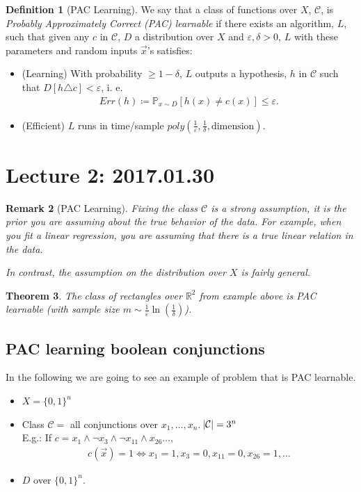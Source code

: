 \documentclass[12pt, letterpaper]{article}
\numberwithin{equation}{section} %
\newcommand{\R}{\mathbb{R}}
\newcommand{\mb}{\mathbb}
\newcommand{\mc}{\mathcal}
\newcommand{\ve}{\varepsilon}
\newtheorem{theorem}{Theorem}[section]
\newtheorem{remark}[theorem]{Remark}
\theoremstyle{definition}
\newtheorem{definition}[theorem]{Definition}
\theoremstyle{remark}
\begin{document}
\begin{definition}[PAC Learning]
	We say that a class of functions over $X$, $\mc C$, is \emph{Probably Approximately Correct (PAC) learnable} if there exists an algorithm, $L$, such that given any $c$ in $\mc C$, $D$ a distribution over $X$ and $\ve, \delta >0$, $L$ with these parameters and random inputs $\vec x$'s satisfies:  
	\begin{itemize}
		\item (Learning) With probability $\geq 1 -\delta$, $L$ outputs a hypothesis, $h$ in $\mc 
		C$ such that $D[h\triangle c]<\ve$, i. e.
		\begin{align}
    		Err(h) \coloneqq \mb P_{x\sim D}[h(x) \ne c(x)] \leq \ve.
		\end{align}
		\item (Efficient) $L$ runs in time/sample $poly\left(\frac1\ve, \frac1\delta, \textrm{dimension}\right)$.
	\end{itemize}
\end{definition}


\section{Lecture 2: 2017.01.30}

\begin{remark}[PAC Learning]
    Fixing the class $\mc C$ is a strong assumption, it is the prior you are assuming about the true behavior of the data. For example, when you fit a linear regression, you are assuming that there is a true linear relation in the data.
    
    In contrast, the assumption on the distribution over $X$ is fairly general.
\end{remark}

\begin{theorem}
    The class of rectangles over $\R^2$ from example above is PAC learnable (with sample size $m\sim\frac1\ve\ln\left(\frac1\delta\right)$).
\end{theorem}

\subsection{PAC learning boolean conjunctions}

In the following we are going to see an example of problem that is PAC learnable.
\begin{itemize}
    \item $X = \lbrace 0, 1 \rbrace^n$
    \item Class $\mc C = $ all conjunctions over $x_1,\ldots,x_n$. $\abs{\mc C} = 3^n$\\
          E.g.: If $c = x_1\wedge \lnot x_3 \wedge \lnot x_{11} \wedge x_{26} \ldots$,
          \begin{align}
              c(\vec x) = 1 \iff x_1 =1, x_3 = 0, x_{11} = 0, x_{26} = 1, \ldots
          \end{align}
    \item $D$ over $\lbrace 0, 1 \rbrace^n$.
\end{itemize}
\end{document}
